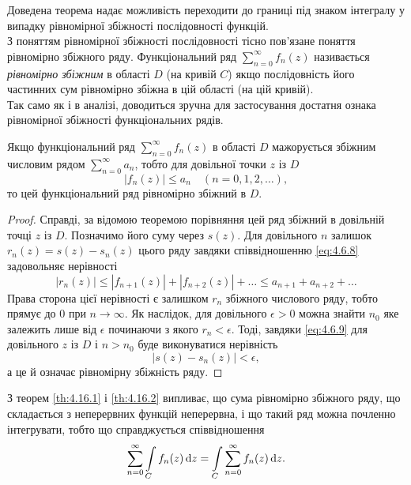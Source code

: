 Доведена теорема надає можливість переходити до границі під знаком інтегралу у випадку рівномірної збіжності послідовності функцій. \\

З поняттям рівномірної збіжності послідовності тісно пов'язане поняття рівномірно збіжного ряду. Функціональний ряд $\sum_{n = 0}^\infty f_n(z)$ називається \textit{рівномірно збіжним} в області $D$ (на кривій $C$) якщо послідовність його частинних сум рівномірно збіжна в цій області (на цій кривій). \\

Так само як і в аналізі, доводиться зручна для застосування достатня ознака рівномірної збіжності функціональних рядів.

\begin{theorem}
	\label{th:4.6.3}
	Якщо функціональний ряд $\sum_{n = 0}^\infty f_n(z)$ в області $D$ мажорується збіжним числовим рядом $\sum_{n = 0}^\infty a_n$, тобто для довільної точки $z$ із $D$
	\begin{equation}
		\label{eq:4.6.8}
		|f_n(z)| \le a_n \quad (n = 0, 1, 2, \ldots),
	\end{equation}
	то цей функціональний ряд рівномірно збіжний в $D$.
\end{theorem}

\begin{proof}
Справді, за відомою теоремою порівняння цей ряд збіжний в довільній точці $z$ із $D$. Позначимо його суму через $s(z)$. Для довільного $n$ залишок $r_n(z) = s(z) - s_n(z)$ цього ряду завдяки співвідношенню \eqref{eq:4.6.8} задовольняє нерівності
\begin{equation}
	\label{eq:4.6.9}
	|r_n(z)| \le |f_{n + 1}(z)| + |f_{n + 2}(z)| + \ldots \le a_{n + 1} + a_{n + 2} + \ldots
\end{equation}
Права сторона цієї нерівності є залишком $r_n$ збіжного числового ряду, тобто прямує до $0$ при $n \to \infty$. Як наслідок, для довільного $\epsilon > 0$ можна знайти $n_0$ яке залежить лише від $\epsilon$ починаючи з якого $r_n < \epsilon$. Тоді, завдяки \eqref{eq:4.6.9} для довільного $z$ із $D$ і $n > n_0$ буде виконуватися нерівність
\begin{equation}
	\label{eq:4.6.10}
	|s(z) - s_n(z)| < \epsilon,
\end{equation} а це й означає рівномірну збіжність ряду.
\end{proof}

З теорем \ref{th:4.16.1} і \ref{th:4.16.2} випливає, що сума рівномірно збіжного ряду, що складається з неперервних функцій неперервна, і що такий ряд можна почленно інтегрувати, тобто що справджується співвідношення
\begin{equation}
	\label{eq:4.6.11}
	\displaystyle\sum\limits_{n = 0}^\infty \displaystyle\int\limits_C f_n(z) \mathop{}\!\mathrm{d} z = \displaystyle\int\limits_C \displaystyle\sum\limits_{n = 0}^\infty f_n(z) \mathop{}\!\mathrm{d} z.
\end{equation}

